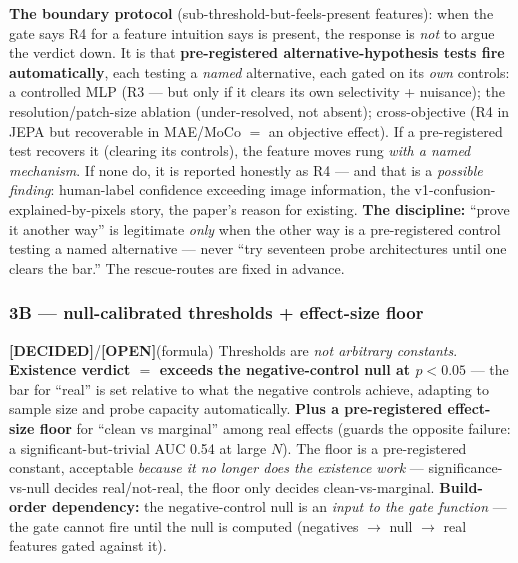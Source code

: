 \documentclass[11pt,a4paper]{article}
\newcommand{\dec}{\textcolor{decided}{\sffamily\bfseries[DECIDED]}}
\newcommand{\opn}{\textcolor{openq}{\sffamily\bfseries[OPEN]}}
\begin{document}
\textbf{The boundary protocol} (sub-threshold-but-feels-present features): when the gate says R4
for a feature intuition says is present, the response is \emph{not} to argue the verdict down. It
is that \textbf{pre-registered alternative-hypothesis tests fire automatically}, each testing a
\emph{named} alternative, each gated on its \emph{own} controls: a controlled MLP (R3 --- but
only if it clears its own selectivity + nuisance); the resolution/patch-size ablation
(under-resolved, not absent); cross-objective (R4 in JEPA but recoverable in MAE/MoCo $=$ an
objective effect). If a pre-registered test recovers it (clearing its controls), the feature
moves rung \emph{with a named mechanism}. If none do, it is reported honestly as R4 --- and that
is a \emph{possible finding}: human-label confidence exceeding image information, the
v1-confusion-explained-by-pixels story, the paper's reason for existing. \textbf{The discipline:}
``prove it another way'' is legitimate \emph{only} when the other way is a pre-registered control
testing a named alternative --- never ``try seventeen probe architectures until one clears the
bar.'' The rescue-routes are fixed in advance.

\subsubsection{3B --- null-calibrated thresholds + effect-size floor}
\dec{}/\opn{}(formula) Thresholds are \emph{not arbitrary constants}. \textbf{Existence verdict
$=$ exceeds the negative-control null at $p<0.05$} --- the bar for ``real'' is set relative to
what the negative controls achieve, adapting to sample size and probe capacity automatically.
\textbf{Plus a pre-registered effect-size floor} for ``clean vs marginal'' among real effects
(guards the opposite failure: a significant-but-trivial AUC 0.54 at large $N$). The floor is a
pre-registered constant, acceptable \emph{because it no longer does the existence work} ---
significance-vs-null decides real/not-real, the floor only decides clean-vs-marginal.
\textbf{Build-order dependency:} the negative-control null is an \emph{input to the gate
function} --- the gate cannot fire until the null is computed (negatives $\rightarrow$ null
$\rightarrow$ real features gated against it).
\end{document}

